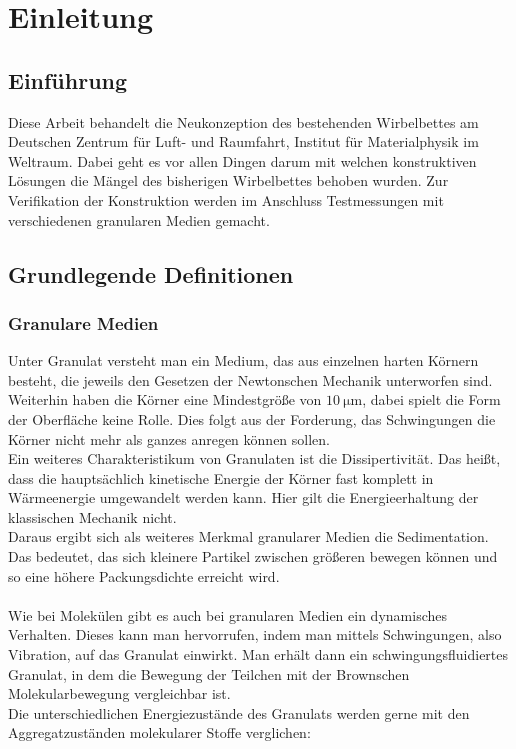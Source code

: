 \chapter{Einleitung}


\section{Einführung}

Diese Arbeit behandelt die Neukonzeption des bestehenden Wirbelbettes am Deutschen Zentrum für Luft- und Raumfahrt, Institut für Materialphysik im Weltraum. Dabei geht es vor allen Dingen darum mit welchen konstruktiven Lösungen die Mängel des bisherigen Wirbelbettes behoben wurden. Zur Verifikation der Konstruktion werden im Anschluss Testmessungen mit verschiedenen granularen Medien gemacht. 


\section{Grundlegende Definitionen}

\subsection{Granulare Medien}

Unter Granulat versteht man ein Medium, das aus einzelnen harten Körnern besteht, die jeweils den Gesetzen der Newtonschen Mechanik unterworfen sind. Weiterhin haben die Körner eine Mindestgröße von $\SI{10}{\micro\meter}$, dabei spielt die Form der Oberfläche keine Rolle. Dies folgt aus der Forderung, das Schwingungen die Körner nicht mehr als ganzes anregen können sollen. \\
Ein weiteres Charakteristikum von Granulaten ist die Dissipertivität. Das heißt, dass die hauptsächlich kinetische Energie der Körner fast komplett in Wärmeenergie umgewandelt werden kann. Hier gilt die Energieerhaltung der klassischen Mechanik nicht. \cite{DLRWebsite} \\
Daraus ergibt sich als weiteres Merkmal granularer Medien die Sedimentation. Das bedeutet, das sich kleinere Partikel zwischen größeren bewegen können und so eine höhere Packungsdichte erreicht wird. \cite{PhysikimKontext} \\
\hfill \\ 
Wie bei Molekülen gibt es auch bei granularen Medien ein dynamisches Verhalten. Dieses kann man hervorrufen, indem man mittels Schwingungen, also Vibration, auf das Granulat einwirkt. Man erhält dann ein schwingungsfluidiertes Granulat, in dem die Bewegung der Teilchen mit der Brownschen Molekularbewegung vergleichbar ist. \\
Die unterschiedlichen Energiezustände des Granulats werden gerne mit den Aggregatzuständen molekularer Stoffe verglichen:


